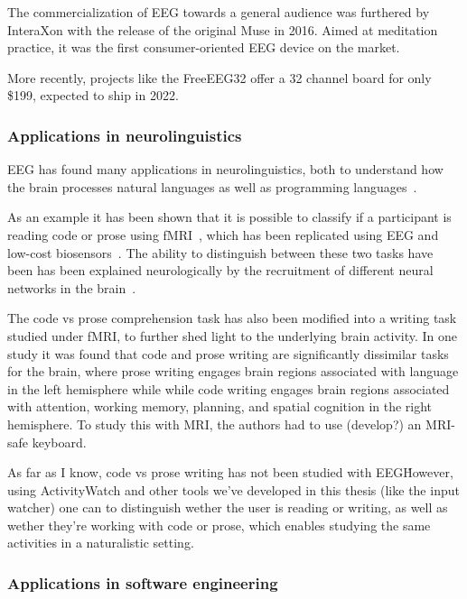     The commercialization of EEG towards a general audience was furthered by InteraXon with the release of the original Muse in 2016. Aimed at meditation practice, it was the first consumer-oriented EEG device on the market.

    More recently, projects like the FreeEEG32 offer a 32 channel board for only \$199, expected to ship in 2022.\cite{noauthor_freeeeg32_nodate}

    \subsubsection{Applications in neurolinguistics}

        EEG has found many applications in neurolinguistics, both to understand how the brain processes natural languages as well as programming languages~\cite{prat_relating_2020}.

         As an example it has been shown that it is possible to classify if a participant is reading code or prose using fMRI~\cite{floyd_decoding_2017}, which has been replicated using EEG and low-cost biosensors~\cite{fucci_replication_2019}. The ability to distinguish between these two tasks have been has been explained neurologically by the recruitment of different neural networks in the brain~\cite{ivanova_comprehension_2020}. 

        The code vs prose comprehension task has also been modified into a writing task studied under fMRI, to further shed light to the underlying brain activity. In one study it was found that code and prose writing are significantly dissimilar tasks for the brain, where prose writing engages brain regions associated with language in the left hemisphere while while code writing engages brain regions associated with attention, working memory, planning, and spatial cognition in the right hemisphere\cite{noauthor_neurological_nodate}. To study this with MRI, the authors had to use (develop?) an MRI-safe keyboard.

        As far as I know, code vs prose writing has not been studied with EEG\. However, using ActivityWatch and other tools we've developed in this thesis (like the input watcher) one can to distinguish wether the user is reading or writing, as well as wether they're working with code or prose, which enables studying the same activities in a naturalistic setting.

    \subsubsection{Applications in software engineering}

